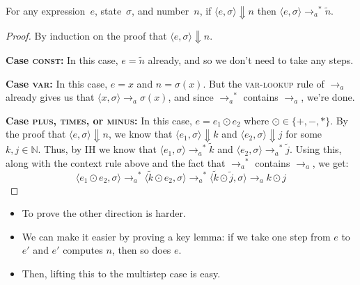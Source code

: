 \documentclass{lecturenotes}
\newcommand{\astep}{\ensuremath{\mathrel{\longrightarrow_a}}}
\begin{document}
\begin{thm}
  For any expression~$e$, state~$\sigma$, and number~$n$, if $\langle e, \sigma \rangle \Downarrow n$ then $\langle e, \sigma\rangle \mathrel{\astep^\ast} \tilde{n}$.
\end{thm}
\begin{proof}
  By induction on the proof that $\langle e, \sigma \rangle \Downarrow n$.

  \noindent\textbf{Case \textsc{const}:} In this case, $e = \tilde{n}$ already, and so we don't need to take any steps.

  \noindent\textbf{Case \textsc{var}:} In this case, $e = x$ and $n = \sigma(x)$.
  But the \textsc{var-lookup} rule of $\astep$ already gives us that $\langle x , \sigma \rangle \astep \sigma(x)$, and since $\astep^\ast$ contains $\astep$, we're done.

  \noindent\textbf{Case \textsc{plus}, \textsc{times}, or \textsc{minus}:}
  In this case, $e = e_1 \odot e_2$ where $\odot \in \{+, -, *\}$.
  By the proof that $\langle e , \sigma \rangle \Downarrow n$, we know that $\langle e_1, \sigma\rangle \Downarrow k$ and $\langle e_2, \sigma\rangle \Downarrow j$ for some $k, j \in \mathbb{N}$.
  Thus, by IH we know that $\langle e_1, \sigma \rangle \mathrel{\astep^\ast} \tilde{k}$ and $\langle e_2, \sigma \rangle \mathrel{\astep^\ast} \tilde{j}$.
  Using this, along with the context rule above and the fact that $\astep^\ast$ contains $\astep$, we get:
  $$\langle e_1 \odot e_2 , \sigma \rangle \mathrel{\astep^\ast} \langle \tilde{k} \odot e_2 , \sigma \rangle \mathrel{\astep^\ast} \langle \tilde{k} \odot \tilde{j}, \sigma\rangle \astep k \odot j$$
\end{proof}

\begin{itemize}
\item To prove the other direction is harder.
\item We can make it easier by proving a key lemma: if we take one step from $e$ to $e'$ and $e'$ computes $n$, then so does $e$.
\item Then, lifting this to the multistep case is easy.  
\end{itemize}
\end{document}
